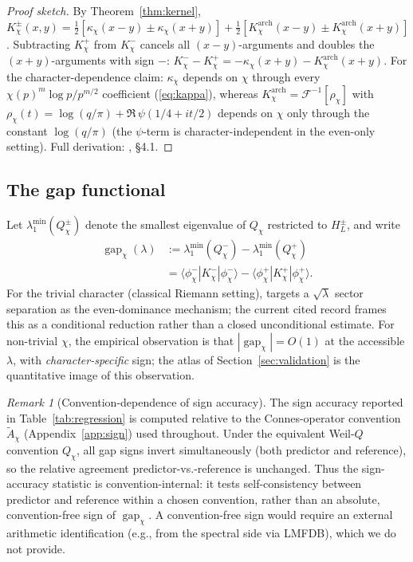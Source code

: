 \documentclass[a4paper,10pt,twocolumn]{article}
\theoremstyle{definition}
\theoremstyle{remark}
\newtheorem{remark}[theorem]{Remark}
\newcommand{\gap}{\operatorname{gap}}
\newcommand{\chifn}{\chi}
\begin{document}
\begin{proof}[Proof sketch]
By Theorem~\ref{thm:kernel},
$K_\chi^\pm(x,y)=\frac{1}{2}[\kappa_\chi(x-y)\pm\kappa_\chi(x+y)]
+\frac{1}{2}[K^{\mathrm{arch}}_\chi(x-y)\pm K^{\mathrm{arch}}_\chi(x+y)]$.
Subtracting $K_\chi^+$ from $K_\chi^-$ cancels all $(x-y)$-arguments
and doubles the $(x+y)$-arguments with sign $-$:
$K_\chi^- - K_\chi^+ = -\kappa_\chi(x+y) - K^{\mathrm{arch}}_\chi(x+y)$.
For the character-dependence claim: $\kappa_\chi$ depends on
$\chifn$ through every $\chifn(p)^m\log p / p^{m/2}$ coefficient
(\eqref{eq:kappa}), whereas
$K^{\mathrm{arch}}_\chi=\mathcal{F}^{-1}[\rho_\chi]$ with
$\rho_\chi(t)=\log(q/\pi)+\Re\,\psi(1/4+it/2)$ depends on $\chifn$
only through the constant $\log(q/\pi)$ (the $\psi$-term is
character-independent in the even-only setting). Full derivation:
\cite{AnalyticKernel}, \S4.1.
\end{proof}

\subsection{The gap functional}

Let $\lambda_1^{\min}(Q_{\chifn}^\pm)$ denote the smallest eigenvalue
of $Q_{\chifn}$ restricted to $H_L^\pm$, and write
\begin{equation}
\label{eq:gap-def}
\begin{aligned}
  \gap_{\chifn}(\lambda)
    &:=\lambda_1^{\min}(Q_{\chifn}^-)
      -\lambda_1^{\min}(Q_{\chifn}^+)\\
    &=\langle\phi_{\chifn}^-|K_{\chifn}^-|\phi_{\chifn}^-\rangle
      -\langle\phi_{\chifn}^+|K_{\chifn}^+|\phi_{\chifn}^+\rangle.
\end{aligned}
\end{equation}
For the trivial character (classical Riemann setting), \cite{RH_II}
targets a $\sqrt{\lambda}$ sector separation as the even-dominance
mechanism; the current cited record frames this as a conditional
reduction rather than a closed unconditional estimate. For non-trivial
$\chifn$, the empirical observation is that
$|\gap_{\chifn}|=O(1)$ at the accessible $\lambda$, with
\emph{character-specific} sign; the atlas of
Section~\ref{sec:validation} is the quantitative image of this
observation.

\begin{remark}[Convention-dependence of sign accuracy]
\label{rem:sign-convention-dependence}
The sign accuracy reported in Table~\ref{tab:regression} is computed
relative to the Connes-operator convention $\tilde{A}_\chi$
(Appendix~\ref{app:sign}) used throughout. Under the equivalent
Weil-$Q$ convention $Q_\chi$, all gap signs invert simultaneously
(both predictor and reference), so the relative agreement
predictor-vs.-reference is unchanged. Thus the sign-accuracy
statistic is convention-internal: it tests self-consistency between
predictor and reference within a chosen convention, rather than an
absolute, convention-free sign of $\gap_\chi$. A convention-free
sign would require an external arithmetic identification (e.g.,
from the spectral side via LMFDB), which we do not provide.
\end{remark}
\end{document}
